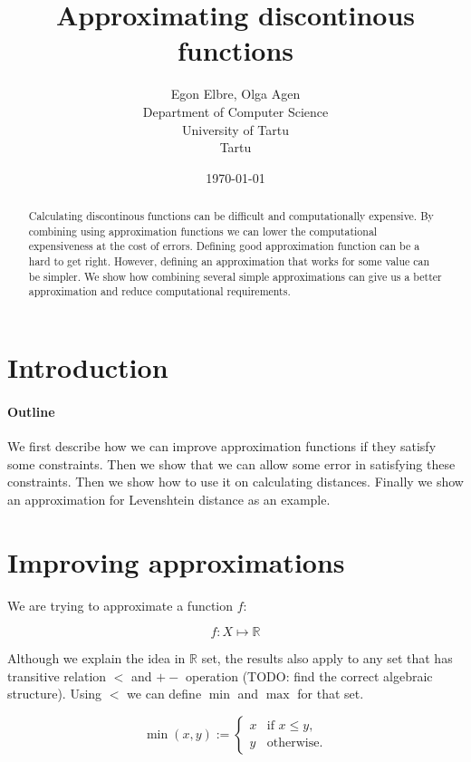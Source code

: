 \documentclass [12pt, a4]{article} %
\title{Approximating discontinous functions}
\author{
    Egon Elbre, Olga Agen \\
        Department of Computer Science \\
    University of Tartu\\
    Tartu\\
}
\date{\today}
\begin{document}
\maketitle

\begin{abstract}
Calculating discontinous functions can be difficult and computationally
expensive. By combining using approximation functions we can lower 
the computational expensiveness at the cost of errors.
Defining good approximation function can be a hard to get right. 
However, defining an approximation that works for some value can 
be simpler. We show how combining several simple approximations 
can give us a better approximation and reduce computational requirements.
\end{abstract}

\section{Introduction}

\paragraph{Outline}

We first describe how we can improve approximation functions if they 
satisfy some constraints. Then we show that we can allow some error
in satisfying these constraints. Then we show how to use it on 
calculating distances. Finally we show an approximation for
Levenshtein distance as an example.

\section{Improving approximations}

\newcommand{\Real}{\mathbb{R}}
\newcommand{\defas}{ := }
\newcommand{\err}[1]{\varepsilon_{#1}}

We are trying to approximate a function $f$:

$$f : X \mapsto \Real$$

Although we explain the idea in $\Real$ set, the results also apply to 
any set that has transitive relation $<$ and $+-$ operation (TODO: find the correct algebraic structure). 
Using $<$ we can define $\min$ and $\max$ for that set.

$$ \min(x,y) \defas \begin{cases}
    x & \text{if $x \leq y$}, \\
    y & \text{otherwise}.
\end{cases}
$$
\end{document}
